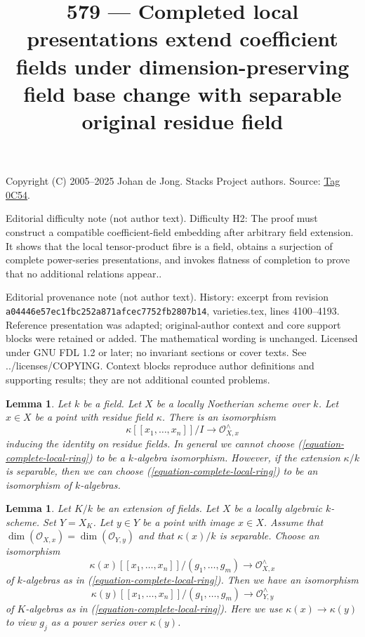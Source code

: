 \documentclass{amsart}
\theoremstyle{plain}
\newtheorem{lemma}[subsection]{Lemma}
\theoremstyle{definition}
\theoremstyle{remark}
\numberwithin{equation}{subsection}
\begin{document}
\title[Stacks Project, Tag 0C54]{579 --- Completed local presentations extend coefficient fields under dimension-preserving field base change with separable original residue field}
\maketitle
\noindent Copyright (C) 2005--2025 Johan de Jong. Stacks Project authors. Source: \href{https://stacks.math.columbia.edu/tag/0C54}{Tag 0C54}.

\noindent Editorial difficulty note (not author text). Difficulty H2: The proof must construct a compatible coefficient-field embedding after arbitrary field extension. It shows that the local tensor-product fibre is a field, obtains a surjection of complete power-series presentations, and invokes flatness of completion to prove that no additional relations appear..

\noindent Editorial provenance note (not author text). History: excerpt from revision \texttt{a0444\allowbreak 6e57e\allowbreak c1fbc\allowbreak 252a8\allowbreak 71afc\allowbreak ec775\allowbreak 2fb28\allowbreak 07b14}, varieties.tex, lines 4100--4193. Reference presentation was adapted; original-author context and core support blocks were retained or added. The mathematical wording is unchanged. Licensed under GNU FDL 1.2 or later; no invariant sections or cover texts. See ../licenses/COPYING. Context blocks reproduce author definitions and supporting results; they are not additional counted problems.

\begin{lemma}
\label{lemma-complete-local-ring-structure-as-algebra}
Let $k$ be a field. Let $X$ be a locally Noetherian scheme over $k$.
Let $x \in X$ be a point with residue field $\kappa$.
There is an isomorphism
\begin{equation}
\label{equation-complete-local-ring}
\kappa[[x_1, \ldots, x_n]]/I \longrightarrow \mathcal{O}_{X, x}^\wedge
\end{equation}
inducing the identity on residue fields.
In general we cannot choose (\ref{equation-complete-local-ring})
to be a $k$-algebra isomorphism. However, if the extension $\kappa/k$
is separable, then we can choose
(\ref{equation-complete-local-ring}) to be an isomorphism of $k$-algebras.
\end{lemma}

\begin{lemma}
\label{lemma-base-change-complete-local-ring}
Let $K/k$ be an extension of fields. Let $X$ be a locally algebraic
$k$-scheme. Set $Y = X_K$. Let $y \in Y$ be a point with image $x \in X$.
Assume that $\dim(\mathcal{O}_{X, x}) = \dim(\mathcal{O}_{Y, y})$
and that $\kappa(x)/k$ is separable.
Choose an isomorphism
$$
\kappa(x)[[x_1, \ldots, x_n]]/(g_1, \ldots, g_m) \longrightarrow
\mathcal{O}_{X, x}^\wedge
$$
of $k$-algebras as in (\ref{equation-complete-local-ring}).
Then we have an isomorphism
$$
\kappa(y)[[x_1, \ldots, x_n]]/(g_1, \ldots, g_m) \longrightarrow
\mathcal{O}_{Y, y}^\wedge
$$
of $K$-algebras as in (\ref{equation-complete-local-ring}). Here we use
$\kappa(x) \to \kappa(y)$ to view $g_j$ as a power series
over $\kappa(y)$.
\end{lemma}
\end{document}
